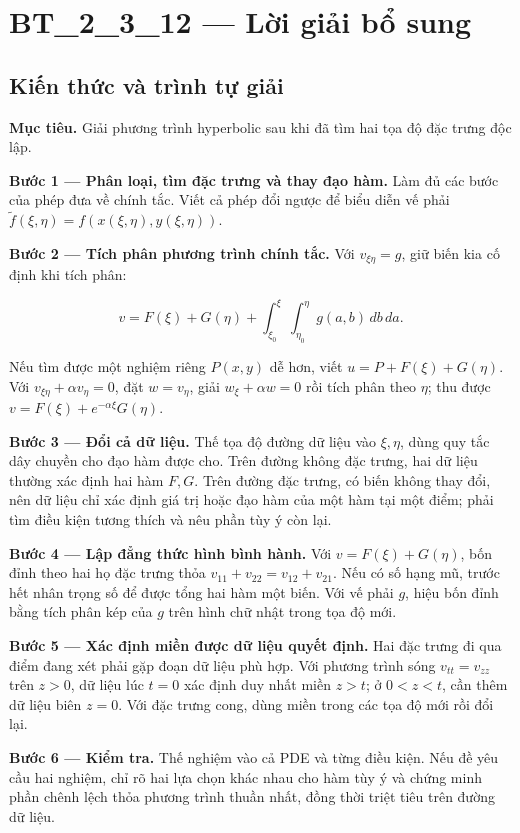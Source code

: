 \documentclass[10pt,a4paper]{article}
\begin{document}
\section*{BT\_2\_3\_12 — Lời giải bổ sung}
\subsection*{Kiến thức và trình tự giải}
\textbf{Mục tiêu.} Giải phương trình hyperbolic sau khi đã tìm hai tọa độ đặc trưng độc lập.

\textbf{Bước 1 — Phân loại, tìm đặc trưng và thay đạo hàm.} Làm đủ các bước của phép đưa về chính tắc. Viết cả phép đổi ngược để biểu diễn vế phải $\widetilde f(\xi,\eta)=f(x(\xi,\eta),y(\xi,\eta))$.

\textbf{Bước 2 — Tích phân phương trình chính tắc.} Với $v_{\xi\eta}=g$, giữ biến kia cố định khi tích phân:


\[
v=F(\xi)+G(\eta)+\int_{\xi_0}^{\xi}\int_{\eta_0}^{\eta}g(a,b)\,db\,da.
\]


Nếu tìm được một nghiệm riêng $P(x,y)$ dễ hơn, viết $u=P+F(\xi)+G(\eta)$. Với $v_{\xi\eta}+\alpha v_\eta=0$, đặt $w=v_\eta$, giải $w_\xi+\alpha w=0$ rồi tích phân theo $\eta$; thu được $v=F(\xi)+e^{-\alpha\xi}G(\eta)$.

\textbf{Bước 3 — Đổi cả dữ liệu.} Thế tọa độ đường dữ liệu vào $\xi,\eta$, dùng quy tắc dây chuyền cho đạo hàm được cho. Trên đường không đặc trưng, hai dữ liệu thường xác định hai hàm $F,G$. Trên đường đặc trưng, có biến không thay đổi, nên dữ liệu chỉ xác định giá trị hoặc đạo hàm của một hàm tại một điểm; phải tìm điều kiện tương thích và nêu phần tùy ý còn lại.

\textbf{Bước 4 — Lập đẳng thức hình bình hành.} Với $v=F(\xi)+G(\eta)$, bốn đỉnh theo hai họ đặc trưng thỏa $v_{11}+v_{22}=v_{12}+v_{21}$. Nếu có số hạng mũ, trước hết nhân trọng số để được tổng hai hàm một biến. Với vế phải $g$, hiệu bốn đỉnh bằng tích phân kép của $g$ trên hình chữ nhật trong tọa độ mới.

\textbf{Bước 5 — Xác định miền được dữ liệu quyết định.} Hai đặc trưng đi qua điểm đang xét phải gặp đoạn dữ liệu phù hợp. Với phương trình sóng $v_{tt}=v_{zz}$ trên $z>0$, dữ liệu lúc $t=0$ xác định duy nhất miền $z>t$; ở $0<z<t$, cần thêm dữ liệu biên $z=0$. Với đặc trưng cong, dùng miền trong các tọa độ mới rồi đổi lại.

\textbf{Bước 6 — Kiểm tra.} Thế nghiệm vào cả PDE và từng điều kiện. Nếu đề yêu cầu hai nghiệm, chỉ rõ hai lựa chọn khác nhau cho hàm tùy ý và chứng minh phần chênh lệch thỏa phương trình thuần nhất, đồng thời triệt tiêu trên đường dữ liệu.
\end{document}
